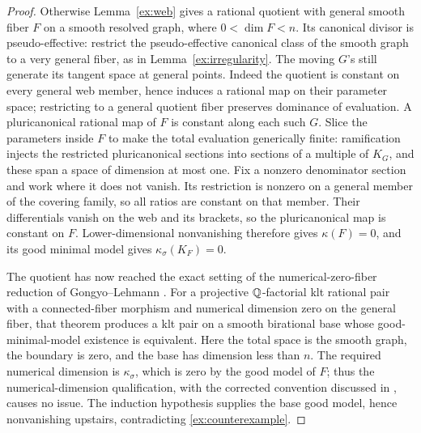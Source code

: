 \begin{proof}
Otherwise Lemma~\ref{ex:web} gives a rational quotient with general
smooth fiber \(F\) on a smooth resolved graph, where
\(0<\dim F<n\). Its canonical divisor is pseudo-effective:
restrict the pseudo-effective canonical class of the smooth graph
to a very general fiber, as in Lemma~\ref{ex:irregularity}.
The moving \(G\)'s still generate its tangent space at general
points. Indeed the quotient is constant on every general web
member, hence induces a rational map on their parameter space;
restricting to a general quotient fiber preserves dominance of
evaluation. A pluricanonical rational map of \(F\) is constant
along each such \(G\). Slice the parameters inside \(F\) to make
the total evaluation generically finite: ramification injects the
restricted pluricanonical sections into sections of a multiple of
\(K_G\), and these span a space of dimension at most one.
Fix a nonzero denominator section and work where it does not
vanish. Its restriction is nonzero on a general member of the
covering family, so all ratios are constant on that member. Their
differentials vanish on the web and its brackets, so the
pluricanonical map is constant on \(F\). Lower-dimensional
nonvanishing therefore gives \(\kappa(F)=0\), and its good minimal
model gives \(\kappa_\sigma(K_F)=0\).

The quotient has now reached the exact setting of the
numerical-zero-fiber reduction of
Gongyo--Lehmann \cite[Theorem~1.3 and Corollary~4.5]{GongyoLehmann2013}.
For a projective \(\mathbb{Q}\)-factorial klt rational pair with a
connected-fiber morphism and numerical dimension zero on the
general fiber, that theorem produces a klt pair on a smooth
birational base whose good-minimal-model existence is equivalent.
Here the total space is the smooth graph, the boundary is zero,
and the base has dimension less than \(n\). The required numerical
dimension is \(\kappa_\sigma\), which is zero by the good model of
\(F\); thus the numerical-dimension qualification, with the
corrected convention discussed in
\cite[Section~3 and Theorem~3.2]{Fujino2019Numerical},
causes no issue. The induction hypothesis supplies the base good
model, hence nonvanishing upstairs, contradicting
\eqref{ex:counterexample}.
\end{proof}

